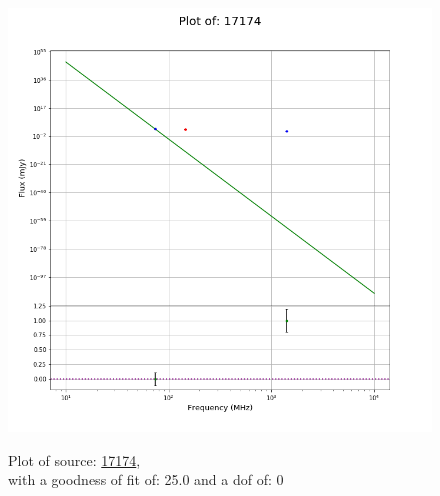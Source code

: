 \documentclass{article}
\begin{document}
\begin{figure}[H]
\begin{minipage}{0.5\textwidth}
        \includegraphics[scale = 0.35]{KmeulenTrap4P23_1min/1min17174.png}
        \captionsetup{labelformat=empty}
        \caption{Plot of source: \href{http://banana.transientskp.org/r4/vlo_KmeulenTrap4P23/runningcatalog/17174}{17174},\\with a goodness of fit of: 25.0 and a dof of: 0}
    \addtocounter{figure}{-1}
    \label{KmeulenTrap4P23:1min:17174:plot}
    \end{minipage}
\end{figure}
\end{document}
